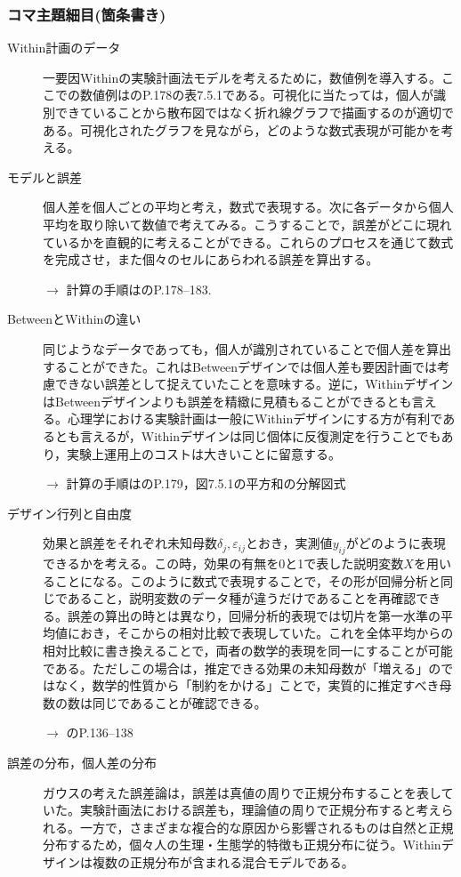 \subsubsection{コマ主題細目(箇条書き)}
\begin{description}
	\item[Within計画のデータ] 一要因Withinの実験計画法モデルを考えるために，数値例を導入する。ここでの数値例は\textcite{Yamada2004}のP.178の表7.5.1である。可視化に当たっては，個人が識別できていることから散布図ではなく折れ線グラフで描画するのが適切である。可視化されたグラフを見ながら，どのような数式表現が可能かを考える。

	\item[モデルと誤差] 個人差を個人ごとの平均と考え，数式で表現する。次に各データから個人平均を取り除いて数値で考えてみる。こうすることで，誤差がどこに現れているかを直観的に考えることができる。これらのプロセスを通じて数式を完成させ，また個々のセルにあらわれる誤差を算出する。
	      \begin{flushright}
		      $\to$ 計算の手順は\textcite{Yamada2004}のP.178--183.
	      \end{flushright}

	\item[BetweenとWithinの違い] 同じようなデータであっても，個人が識別されていることで個人差を算出することができた。これはBetweenデザインでは個人差も要因計画では考慮できない誤差として捉えていたことを意味する。逆に，WithinデザインはBetweenデザインよりも誤差を精緻に見積もることができるとも言える。心理学における実験計画は一般にWithinデザインにする方が有利であるとも言えるが，Withinデザインは同じ個体に反復測定を行うことでもあり，実験上運用上のコストは大きいことに留意する。
	      \begin{flushright}
		      $\to$ 計算の手順は\textcite{Yamada2004}のP.179，図7.5.1の平方和の分解図式
	      \end{flushright}

	\item[デザイン行列と自由度] 効果と誤差をそれぞれ未知母数$\delta_j,\varepsilon_{ij}$とおき，実測値${y_{ij}}$がどのように表現できるかを考える。この時，効果の有無を0と1で表した説明変数$X$を用いることになる。このように数式で表現することで，その形が回帰分析と同じであること，説明変数のデータ種が違うだけであることを再確認できる。誤差の算出の時とは異なり，回帰分析的表現では切片を第一水準の平均値におき，そこからの相対比較で表現していた。これを全体平均からの相対比較に書き換えることで，両者の数学的表現を同一にすることが可能である。ただしこの場合は，推定できる効果の未知母数が「増える」のではなく，数学的性質から「制約をかける」ことで，実質的に推定すべき母数の数は同じであることが確認できる。
	      \begin{flushright}
		      $\to$ \textcite{kosugi2018}のP.136--138
	      \end{flushright}
	\item[誤差の分布，個人差の分布] ガウスの考えた誤差論は，誤差は真値の周りで正規分布することを表していた。実験計画法における誤差も，理論値の周りで正規分布すると考えられる。一方で，さまざまな複合的な原因から影響されるものは自然と正規分布するため，個々人の生理・生態学的特徴も正規分布に従う。Withinデザインは複数の正規分布が含まれる混合モデルである。

\end{description}
